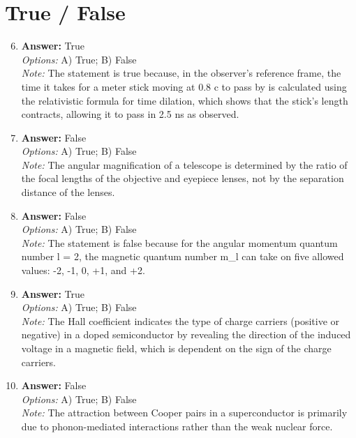 \documentclass[12pt]{article}
\begin{document}
\section*{True / False}
\begin{enumerate}[label=\arabic*.]
\setcounter{enumi}{5}
\item \textbf{Answer:} True
\\ \textit{Options:} A) True; B) False
\\ \textit{Note:} The statement is true because, in the observer's reference frame, the time it takes for a meter stick moving at 0.8 c to pass by is calculated using the relativistic formula for time dilation, which shows that the stick's length contracts, allowing it to pass in 2.5 ns as observed.
\item \textbf{Answer:} False
\\ \textit{Options:} A) True; B) False
\\ \textit{Note:} The angular magnification of a telescope is determined by the ratio of the focal lengths of the objective and eyepiece lenses, not by the separation distance of the lenses.
\item \textbf{Answer:} False
\\ \textit{Options:} A) True; B) False
\\ \textit{Note:} The statement is false because for the angular momentum quantum number l = 2, the magnetic quantum number m\_l can take on five allowed values: -2, -1, 0, +1, and +2.
\item \textbf{Answer:} True
\\ \textit{Options:} A) True; B) False
\\ \textit{Note:} The Hall coefficient indicates the type of charge carriers (positive or negative) in a doped semiconductor by revealing the direction of the induced voltage in a magnetic field, which is dependent on the sign of the charge carriers.
\item \textbf{Answer:} False
\\ \textit{Options:} A) True; B) False
\\ \textit{Note:} The attraction between Cooper pairs in a superconductor is primarily due to phonon-mediated interactions rather than the weak nuclear force.
\end{enumerate}
\end{document}
